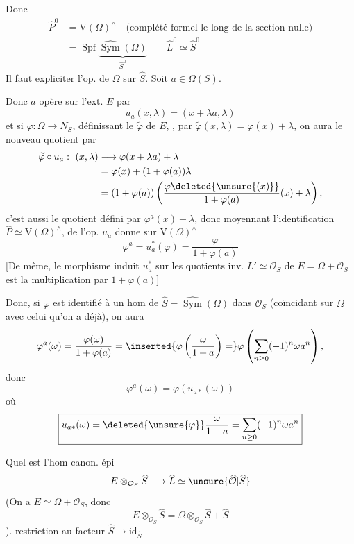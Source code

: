 Donc
\[
\begin{aligned}
\widehat P^0&=\mathrm{V}(\Omega)^\wedge\quad\text{(complété formel le long de la section nulle)}\\
&=\operatorname{Spf}\underbrace{\widehat{\operatorname{Sym}}(\Omega)}_{\widehat S^0}
\qquad \widehat L^0\simeq\widehat S^0
\end{aligned}
\]
Il faut expliciter l'op. de $\Omega$ sur $\widehat S$. Soit $a\in\Omega(S)$.

Donc $a$ opère sur l'ext. $E$ par
\[
u_a(x,\lambda)=(x+\lambda a,\lambda)
\]
et si  $\varphi:\Omega\to N_S$, définissant le  $\widetilde\varphi$ de $E$, , par $\widetilde\varphi(x,\lambda)=\varphi(x)+\lambda$, on aura le nouveau quotient par
\[
\begin{aligned}
\widetilde\varphi\circ u_a:\ (x,\lambda)&\longrightarrow\varphi(x+\lambda a)+\lambda\\
&=\varphi(x)+(1+\varphi(a))\lambda\\
&=(1+\varphi(a))\left(\frac{\varphi\deleted{\unsure{(x)}}}{1+\varphi(a)}(x)+\lambda\right),
\end{aligned}
\]
c'est aussi le quotient défini par  $\varphi^a(x)+\lambda$, donc
moyennant l'identification $\widehat P\simeq\mathrm{V}(\Omega)^\wedge$,  de l'op. $u_a$ donne sur $\mathrm{V}(\Omega)^\wedge$
\[
\varphi^a=u_a^*(\varphi)=\frac{\varphi}{1+\varphi(a)}
\]
[De même, le morphisme induit $u_a^*$ sur les quotients inv. $L'\simeq\mathcal{O}_S$  de $E=\Omega+\mathcal{O}_S$ est la multiplication par $1+\varphi(a)$]

Donc,  si $\varphi$ est identifié à un hom de $\widehat S=\widehat{\operatorname{Sym}}(\Omega)$ dans $\mathcal{O}_S$ (coïncidant sur $\Omega$ avec celui qu'on a déjà), on aura
\[
\varphi^a(\omega)=\frac{\varphi(\omega)}{1+\varphi(a)}=
\inserted{\varphi\left(\frac{\omega}{1+a}\right)=}
\varphi\left(\sum_{n\geq0}(-1)^n\omega a^n\right),
\]
donc
\[
\varphi^a(\omega)=\varphi(u_{a*}(\omega))
\]
où
\[
\boxed{u_{a*}(\omega)=\deleted{\unsure{\varphi}}\frac{\omega}{1+a}=\sum_{n\geq0}(-1)^n\omega a^n}
\]

Quel est l'hom canon. épi
\[
E\otimes_{\mathcal{O}_S}\widehat S\longrightarrow\widehat L\simeq\unsure{\widehat{\mathcal{O}}|\widehat S}
\]
(On a $E\simeq\Omega+\mathcal{O}_S$, donc
\[
E\otimes_{\mathcal{O}_S}\widehat S=\Omega\otimes_{\mathcal{O}_S}\widehat S+\widehat S
\]
).
 restriction au facteur $\widehat S\longrightarrow\mathrm{id}_{\widehat S}$

